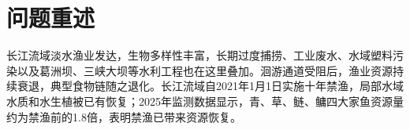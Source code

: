 \documentclass{MMCStyle}
\begin{document}
\begin{abstract}
长江十年禁渔实施后，四大家鱼资源量回升，长江江豚和长江鲟种群亦呈恢复态势；资源枯竭、江湖连通性受阻、水体污染与外来物种入侵却仍同时存在。为回答"资源恢复能否稳定转化为生态系统健康改善"，本文把流域平均食物网、珍稀物种响应、Hastings-Powell三级食物链和综合情景评价置于同一分层动力学模型中，考察禁渔收益从基础资源层向经济鱼类、珍稀物种及长期动力学行为传递时发生的变化。

问题一按食性保留四类基础资源与四大家鱼功能群的配对关系，用2025年四大家鱼资源量恢复至禁渔前1.8倍标定唯一增益参数，湖北江段单网次渔获量提升120\%作为局地对照。结果显示：2025年四大家鱼总生物量为禁渔前的1.805倍，单位捕捞努力量渔获量($\mathrm{CPUE}^*$)为1.838倍；摄食压力指数升至4.213时，基础资源量末值降至0.204。鱼群恢复与基础资源承压由此同时出现。

问题二接收问题一的资源--鱼群轨迹，以综合生态状态指数调节中层猎物承载力，建立珍稀物种种群响应模型，并设置高阻隔、无人工放流和污染三种对照情景。基线情景下，长江江豚与长江鲟种群末值为禁渔前的1.133倍和1.140倍；高阻隔情景降至0.901倍和0.856倍，无人工放流时长江鲟降至0.519倍，污染情景下二者为0.610倍和0.704倍。结果显示，通道阻隔同时压低两类物种，放流变化则主要作用于长江鲟。

问题三、四采用统一的Hastings-Powell三级食物链模型。承载力参数$K$增大时，轨道由规则有界振荡转为复杂非线性波动；代表点$K=1.795$、$2.665$、$4.800$的峰谷差和峰间隔离散程度均增大。短时间窗分析显示，首个连续正李雅普诺夫指数区间位于$K=3.2186$附近，但75组扩展测试中仅5组在$K=3.20\sim3.22$区间保留由负转正。故本文仅保留"系统动力学复杂性随承载力提高而增强"的方向性结论。

问题五在同一积分后期时间窗内比较饵料资源、长江江豚、长江鲟和入侵压力，采用熵权-CRITIC组合赋权模型，取二者平均后得到三种情景得分0.662、0.423和0.155。组合权重经2000次局部扰动，情景排序稳定率仍为100\%。这一递减次序对应"水体污染首先削弱禁渔收益，外来物种入侵进一步导致系统状态恶化"。

十年禁渔已经带来资源恢复，但资源量回升不会自然转化为系统整体健康改善。若不同步推进水质治理、江湖连通性修复、珍稀物种定向放流与入侵防控，禁渔收益在向高营养级传递及多重压力叠加过程中仍可能逐步减弱。
\end{abstract}

\section{问题重述}
长江流域淡水渔业发达，生物多样性丰富，长期过度捕捞、工业废水、水域塑料污染以及葛洲坝、三峡大坝等水利工程也在这里叠加。洄游通道受阻后，渔业资源持续衰退，典型食物链随之退化。长江流域自2021年1月1日实施十年禁渔，局部水域水质和水生植被已有恢复；2025年监测数据显示，青、草、鲢、鳙四大家鱼资源量约为禁渔前的1.8倍，表明禁渔已带来资源恢复。
\end{document}
